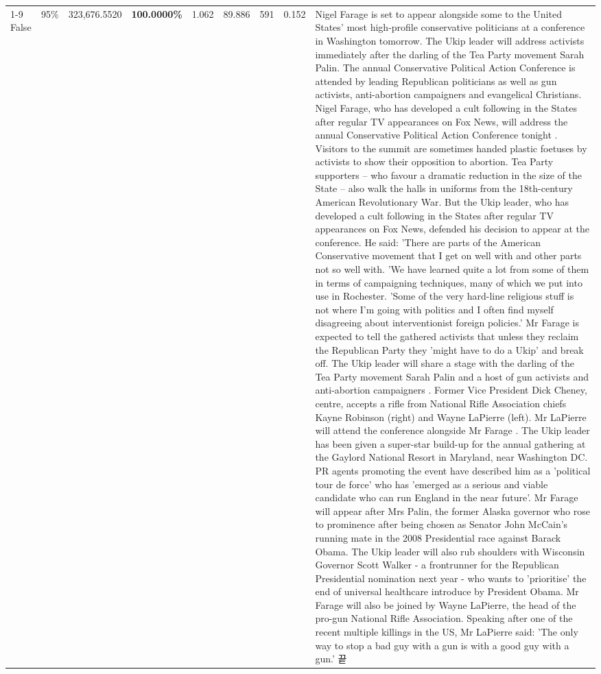 \begin{table}[H]
\begin{tabular}{lllrlllll}
\cline{1-9} \cline{2-9}
False & 95\% & 323,676.5520 & \bfseries \color{red} 100.0000\% & 1.062 & 89.886 & 591 & 0.152 & Nigel Farage is set to appear alongside some to the United States' most high-profile conservative politicians at a conference in Washington tomorrow. The Ukip leader will address activists immediately after the darling of the Tea Party movement Sarah Palin. The annual Conservative Political Action Conference is attended by leading Republican politicians as well as gun activists, anti-abortion campaigners and evangelical Christians. Nigel Farage, who has developed a cult following in the States after regular TV appearances on Fox News, will address the annual Conservative Political Action Conference tonight . Visitors to the summit are sometimes handed plastic foetuses by activists to show their opposition to abortion. Tea Party supporters – who favour a dramatic reduction in the size of the State – also walk the halls in uniforms from the 18th-century American Revolutionary War. But the Ukip leader, who has developed a cult following in the States after regular TV appearances on Fox News, defended his decision to appear at the conference. He said: 'There are parts of the American Conservative movement that I get on well with and other parts not so well with. 'We have learned quite a lot from some of them in terms of campaigning techniques, many of which we put into use in Rochester. 'Some of the very hard-line religious stuff is not where I'm going with politics and I often find myself disagreeing about interventionist foreign policies.' Mr Farage is expected to tell the gathered activists that unless they reclaim the Republican Party they 'might have to do a Ukip' and break off. The Ukip leader will share a stage with the darling of the Tea Party movement Sarah Palin and a host of gun activists and anti-abortion campaigners . Former Vice President Dick Cheney, centre, accepts a rifle from National Rifle Association chiefs Kayne Robinson (right) and Wayne LaPierre (left). Mr LaPierre will attend the conference alongside Mr Farage . The Ukip leader has been given a super-star build-up for the annual gathering at the Gaylord National Resort in Maryland, near Washington DC. PR agents promoting the event have described him as a 'political tour de force' who has 'emerged as a serious and viable candidate who can run England in the near future'. Mr Farage will appear after Mrs Palin, the former Alaska governor who rose to prominence after being chosen as Senator John McCain's running mate in the 2008 Presidential race against Barack Obama. The Ukip leader will also rub shoulders with Wisconsin Governor Scott Walker - a frontrunner for the Republican Presidential nomination next year - who wants to 'prioritise' the end of universal healthcare introduce by President Obama. Mr Farage will also be joined by Wayne LaPierre, the head of the pro-gun National Rifle Association. Speaking after one of the recent multiple killings in the US, Mr LaPierre said: 'The only way to stop a bad guy with a gun is with a good guy with a gun.' 끝 \\

\end{tabular}
\end{table}
